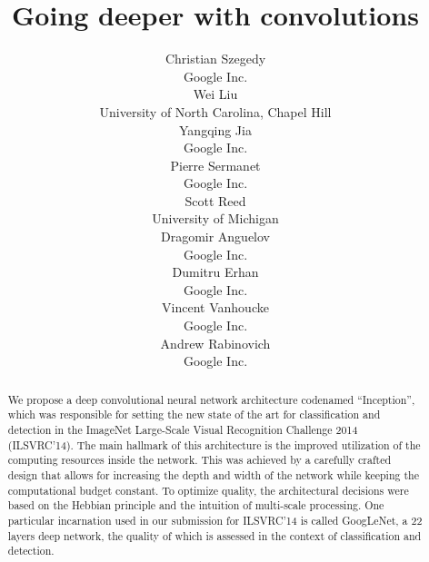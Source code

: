 \documentclass{article}
\title{Going deeper with convolutions}
\author{
Christian Szegedy\\
Google Inc.\\
\And
Wei Liu \\
University of North Carolina, Chapel Hill\\ 
\And
Yangqing Jia\\
Google Inc.\\
\And
Pierre Sermanet \\
Google Inc.\\
\And
Scott Reed\\
University of Michigan\\
\And
Dragomir Anguelov\\
Google Inc.\\
\And
Dumitru Erhan\\
Google Inc.\\
\And
Vincent Vanhoucke\\
Google Inc.\\
\And
Andrew Rabinovich\\
Google Inc.\\
}
\begin{document}
\maketitle

\newtheorem{theorem}{Theorem}[section]
\newtheorem{lemma}[theorem]{Lemma}
\newtheorem{proposition}[theorem]{Proposition}
\newtheorem{corollary}[theorem]{Corollary}


\begin{abstract}
We propose a deep convolutional neural network architecture codenamed “Inception”, which was responsible for setting the new state of the art for classification and detection in the ImageNet Large-Scale Visual Recognition Challenge 2014 (ILSVRC’14). The main hallmark of this architecture is the improved utilization of the computing resources inside the network. This was achieved by a carefully crafted design that allows for increasing the depth and width of the network while keeping the computational budget constant. To optimize quality, the architectural decisions were based on the Hebbian principle and the intuition of multi-scale processing. One particular incarnation used in our submission for ILSVRC’14 is called GoogLeNet, a 22 layers deep network, the quality of which is assessed in the context of classification and detection.
\end{abstract}













\end{document}
